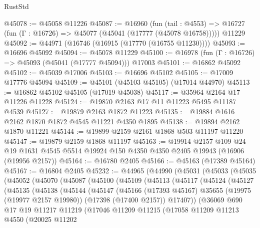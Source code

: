 \begin{lexlean}{RustStd}
\begin{coremodule}
@45078 := @45058 @11226
@45087 := @16960
    (fun (tail : @4553) => @16727 (fun (Γ : @16726) => @45077 (@45041 (@17777 (@45078 @16758)))))
    @11229
@45092 := @44971 (@16746 (@16915 (@17770 (@16755 @11230))))
@45093 := @16696 @45092
@45094 := @45078 @11229
@45100 := @16978 (fun (Γ : @16726) => @45093 (@45041 (@17777 @45094))) @17003
@45101 := @16862 @45092
@45102 := @45039 @17006
@45103 := @16696 @45102
@45105 := @17009 @17776 @45094
@45109 := @45101 (@45103 @45105) (@17014 @44970)
@45113 := @16862 @45102 @45105 (@17019 @45038)
@45117 := @35964 @2164 @17 @11226 @11228
@45124 := @19870 @2163 @17 @11 @11223 @5495 @11187 @4539
@45127 := @19879 @2163 @1872 @11223
@45135 := @19884 @1616 @2162 @1870 @1872 @4545 @11221 @4350 @1895
@45138 := @19894 @2162 @1870 @11221
@45144 := @19899 @2159 @2161 @1868 @503 @11197 @11220
@45147 := @19879 @2159 @1868 @11197
@45163 := @19914
    @2157
    @109
    @24
    @19
    @1631
    @4545
    @5514
    @19924
    @150
    @4350
    @4350
    @2405
    @19943
    (@16906 (@19956 @2157))
@45164 := @16780 @2405
@45166 := @45163 (@17389 @45164)
@45167 := @16804 @2405
@45232 := @44965
    (@44990
      (@45031
        (@45033
          (@45035
            (@45052
              (@45070
                (@45087
                  (@45100
                    (@45109
                      (@45113
                        (@45117
                          (@45124
                            (@45127
                              (@45135
                                (@45138
                                  (@45144
                                    (@45147
                                      (@45166
                                        (@17393 @45167)
                                        @35655
                                        (@19975 (@19977 @2157 @19980))
                                        (@17398 (@17400 @2157))
                                        @17407))
                                    (@36069
                                      @690
                                      @17
                                      @19
                                      @11217
                                      @11219
                                      (@17046
                                        @11209
                                        @11215
                                        (@17058
                                          @11209
                                          @11213
                                          @4550
                                          (@20025
                                            @11202

\end{coremodule}
\end{lexlean}
